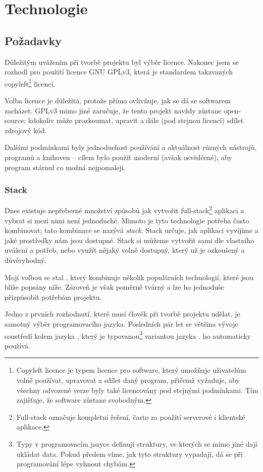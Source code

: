 \hypertarget{Technologie}{\chapter{Technologie}}

\section{Požadavky}

Důležitým uvážením při tvorbě projektu byl výběr licence. Nakonec jsem se rozhodl pro použití licence GNU GPLv3, která je standardem takzvaných copyleft\footnote{Copyleft licence je typem licence pro software, který umožňuje uživatelům volně používat, upravovat a sdílet daný program, přičemž vyžaduje, aby všechny odvozené verze byly také licencovány pod stejnými podmínkami. Tím zajišťuje, že software zůstane svobodným.} licencí.

Volba licence je důležitá, protože přímo ovlivňuje, jak se dá se softwarem zacházet. GPLv3 mimo jiné zaručuje, že tento projekt navždy zůstane open-source; kdokoliv může prozkoumat, upravit a dále (pod stejnou licencí) sdílet zdrojový kód.\cite{choosealicense}

Dalšími podmínkami byly jednoduchost používání a aktuálnost různých nástrojů, programů a knihoven -- cílem bylo použít moderní (avšak osvědčené), aby program stárnul co možná nejpomaleji.

\subsection{Stack}

Dnes existuje nepřeberné množství způsobů jak vytvořit full-stack\footnote{Full-stack označuje kompletní řešení, často za použití serverové i klientské aplikace.} aplikaci a vybrat si mezi nimi není jednoduché. Mimoto je tyto technologie potřeba často kombinovat; tato kombinace se nazývá \emph{stack}. Stack určuje, jak aplikaci vyvíjíme a jaké prostředky nám jsou dostupné. Stack si můžeme vytvořit sami dle vlastního uvážení a potřeb, nebo využít nějaký volně dostupný, který už je ozkoušený a důvěryhodný.

Mojí volbou se stal , který kombinuje několik populárních technologií, které jsou blíže popsány níže. Zároveň je však poměrně tvárný a lze ho jednoduše přizpůsobit potřebám projektu.\cite{t3stack}

Jedno z prvních rozhodnutí, které musí člověk při tvorbě projektu udělat, je samotný výběr programovacího jazyka. Posledních pár let se většina vývoje soustředí kolem jazyka , který je typovanou\footnote{Typy v programovacím jazyce definují struktury, ve kterých se mimo jiné dají ukládat data. Pokud předem víme, jak tyto struktury vypadají, dá se při programování lépe vyhnout chybám.} variantou jazyka .  ho automaticky používá. 

